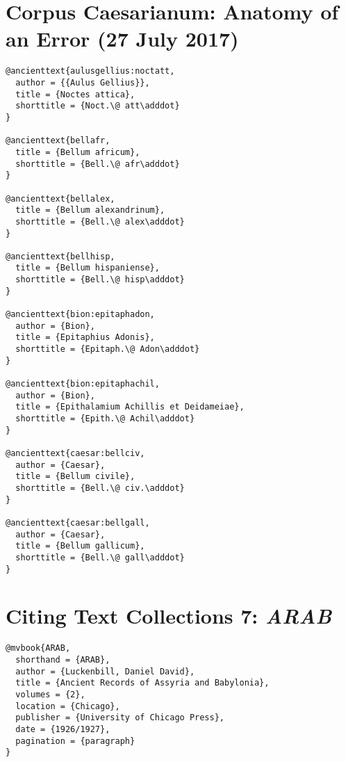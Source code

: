 \documentclass[a4paper]{article}
\begin{document}
\section{Corpus Caesarianum: Anatomy of an Error (27 July 2017)}

\begin{verbatim}
@ancienttext{aulusgellius:noctatt,
  author = {{Aulus Gellius}},
  title = {Noctes attica},
  shorttitle = {Noct.\@ att\adddot}
}

@ancienttext{bellafr,
  title = {Bellum africum},
  shorttitle = {Bell.\@ afr\adddot}
}

@ancienttext{bellalex,
  title = {Bellum alexandrinum},
  shorttitle = {Bell.\@ alex\adddot}
}

@ancienttext{bellhisp,
  title = {Bellum hispaniense},
  shorttitle = {Bell.\@ hisp\adddot}
}

@ancienttext{bion:epitaphadon,
  author = {Bion},
  title = {Epitaphius Adonis},
  shorttitle = {Epitaph.\@ Adon\adddot}
}

@ancienttext{bion:epitaphachil,
  author = {Bion},
  title = {Epithalamium Achillis et Deidameiae},
  shorttitle = {Epith.\@ Achil\adddot}
}

@ancienttext{caesar:bellciv,
  author = {Caesar},
  title = {Bellum civile},
  shorttitle = {Bell.\@ civ.\adddot}
}

@ancienttext{caesar:bellgall,
  author = {Caesar},
  title = {Bellum gallicum},
  shorttitle = {Bell.\@ gall\adddot}
}
\end{verbatim}

\begin{verbcite}
  \nocite{aulusgellius:noctatt, bellafr, bellalex, bellhisp, bion:epitaphadon,
    bion:epitaphachil, caesar:bellciv, caesar:bellgall}
\end{verbcite}
\exampleabbreviations
{}

\section{Citing Text Collections 7: \emph{ARAB}}

\begin{verbatim}
@mvbook{ARAB,
  shorthand = {ARAB},
  author = {Luckenbill, Daniel David},
  title = {Ancient Records of Assyria and Babylonia},
  volumes = {2},
  location = {Chicago},
  publisher = {University of Chicago Press},
  date = {1926/1927},
  pagination = {paragraph}
}
\end{verbatim}
\end{document}
